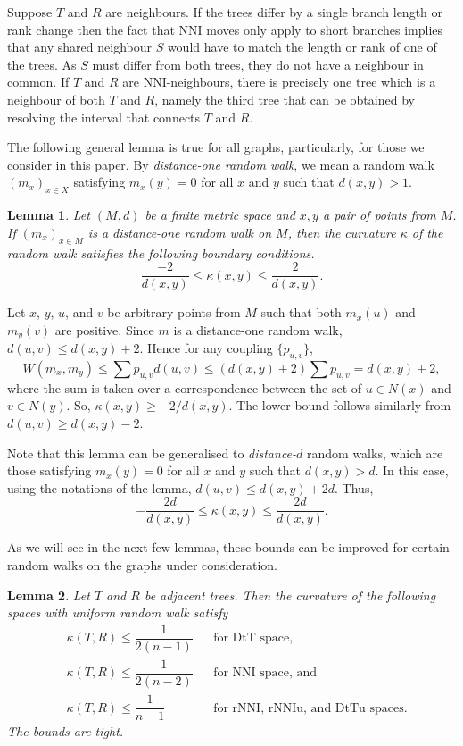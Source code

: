 \documentclass{amsart}
\newtheorem{lemma}{Lemma}
\newcommand{\nni}{\mathrm{NNI}}
\newcommand{\rnni}{\mathrm{rNNI}}
\newcommand{\rnniu}{\mathrm{rNNIu}}
\newcommand{\mdts}{\mathrm{DtT}}
\newcommand{\mdtsu}{\mathrm{DtTu}}
\begin{document}
\proof
Suppose $T$ and $R$ are neighbours.
If the trees differ by a single branch length or rank change then the fact that NNI moves only apply to short branches implies that any shared neighbour $S$ would have to match the length or rank of one of the trees.
As $S$ must differ from both trees, they do not have a neighbour in common.
If $T$ and $R$ are NNI-neighbours, there is precisely one tree which is a neighbour of both $T$ and $R$, namely the third tree that can be obtained by resolving the interval that connects $T$ and $R$.
\endproof

The following general lemma is true for all graphs, particularly, for those we consider in this paper.
By {\em distance-one random walk}, we mean a random walk $(m_x)_{x \in X}$ satisfying $m_x(y) = 0$ for all $x$ and $y$ such that $d(x,y) > 1$.

\begin{lemma}\label{curvBoundGeneral}
Let $(M,d)$ be a finite metric space and $x,y$ a pair of points from $M$.
If $(m_x)_{x \in M}$ is a distance-one random walk on $M$, then the curvature $\kappa$ of the random walk satisfies the following boundary conditions.
\[
\dfrac{-2}{d(x,y)} \leq \kappa(x,y) \leq \dfrac{2}{d(x,y)}.
\]
\end{lemma}

\proof
Let $x$, $y$, $u$, and $v$ be arbitrary points from $M$ such that both $m_x(u)$ and $m_y(v)$ are positive.
Since $m$ is a distance-one random walk, $d(u,v) \leq d(x,y) + 2$.
Hence for any coupling $\{p_{u,v}\}$,
\[
W(m_x,m_y) \leq \sum p_{u,v} d(u,v) \leq (d(x,y)+2)\sum p_{u,v} = d(x,y) + 2,
\]
where the sum is taken over a correspondence between the set of $u \in N(x)$ and $v \in N(y)$.
So, $\kappa(x,y) \geq - 2/d(x,y)$.
The lower bound follows similarly from $d(u,v) \geq d(x,y) - 2$.
\endproof

Note that this lemma can be generalised to {\em distance-$d$} random walks, which are those satisfying $m_x(y) = 0$ for all $x$ and $y$ such that $d(x,y) > d$.
In this case, using the notations of the lemma, $d(u,v) \leq d(x,y) + 2d$.
Thus,
\[
-\dfrac{2d}{d(x,y)} \leq \kappa(x,y) \leq \dfrac{2d}{d(x,y)}.
\]

As we will see in the next few lemmas, these bounds can be improved for certain random walks on the graphs under consideration.

\begin{lemma}\label{uniformUpper}
Let $T$ and $R$ be adjacent trees.
Then the curvature of the following spaces with uniform random walk satisfy
\begin{align*}
& \kappa(T,R) \leq \dfrac{1}{2(n-1)}	&& \mbox{for $\mdts$ space,}\\
& \kappa(T,R) \leq \dfrac{1}{2(n-2)}	&& \mbox{for $\nni$ space, and}\\
& \kappa(T,R) \leq \dfrac{1}{n-1}	&& \mbox{for $\rnni$, $\rnniu$, and $\mdtsu$ spaces.}
\end{align*}
The bounds are tight.
\end{lemma}
\end{document}
